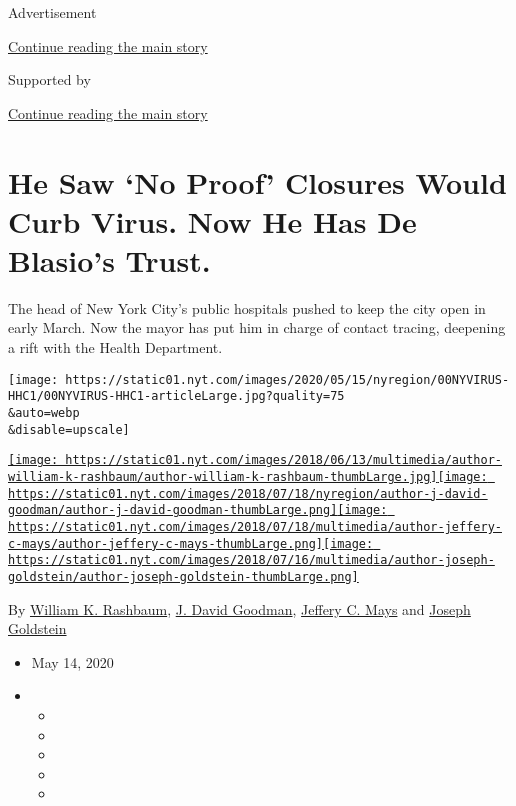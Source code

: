 Advertisement

\protect\hyperlink{after-top}{Continue reading the main story}

Supported by

\protect\hyperlink{after-sponsor}{Continue reading the main story}

\hypertarget{he-saw-no-proof-closures-would-curb-virus-now-he-has-de-blasios-trust}{%
\section{He Saw `No Proof' Closures Would Curb Virus. Now He Has De
Blasio's
Trust.}\label{he-saw-no-proof-closures-would-curb-virus-now-he-has-de-blasios-trust}}

The head of New York City's public hospitals pushed to keep the city
open in early March. Now the mayor has put him in charge of contact
tracing, deepening a rift with the Health Department.

\texttt{[image: https://static01.nyt.com/images/2020/05/15/nyregion/00NYVIRUS-HHC1/00NYVIRUS-HHC1-articleLarge.jpg?quality=75\\\&auto=webp\\\&disable=upscale]}

\href{https://www.nytimes.com/by/william-k-rashbaum}{\texttt{[image: https://static01.nyt.com/images/2018/06/13/multimedia/author-william-k-rashbaum/author-william-k-rashbaum-thumbLarge.jpg]}}\href{https://www.nytimes.com/by/j-david-goodman}{\texttt{[image: https://static01.nyt.com/images/2018/07/18/nyregion/author-j-david-goodman/author-j-david-goodman-thumbLarge.png]}}\href{https://www.nytimes.com/by/jeffery-c-mays}{\texttt{[image: https://static01.nyt.com/images/2018/07/18/multimedia/author-jeffery-c-mays/author-jeffery-c-mays-thumbLarge.png]}}\href{https://www.nytimes.com/by/joseph-goldstein}{\texttt{[image: https://static01.nyt.com/images/2018/07/16/multimedia/author-joseph-goldstein/author-joseph-goldstein-thumbLarge.png]}}

By \href{https://www.nytimes.com/by/william-k-rashbaum}{William K.
Rashbaum}, \href{https://www.nytimes.com/by/j-david-goodman}{J. David
Goodman}, \href{https://www.nytimes.com/by/jeffery-c-mays}{Jeffery C.
Mays} and \href{https://www.nytimes.com/by/joseph-goldstein}{Joseph
Goldstein}

\begin{itemize}
\item
  May 14, 2020
\item
  \begin{itemize}
  \item
  \item
  \item
  \item
  \item
  \end{itemize}
\end{itemize}

